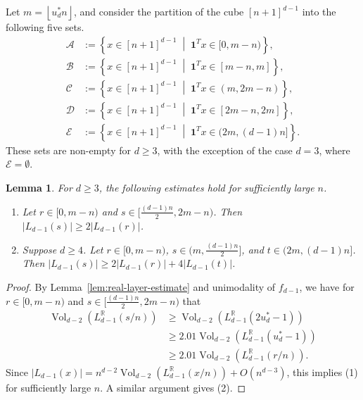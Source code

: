 \documentclass{article}
\newcommand{\floor}[1]{\left\lfloor #1 \right\rfloor}
\newcommand{\setcond}[2]{\left\{ #1 \;\middle\vert\; #2 \right\}}
\newcommand{\RR}{\mathbb{R}}
\newcommand{\cA}{\mathcal{A}}
\newcommand{\cB}{\mathcal{B}}
\newcommand{\cC}{\mathcal{C}}
\newcommand{\cD}{\mathcal{D}}
\newcommand{\cE}{\mathcal{E}}
\newcommand{\ones}{\mathbf{1}}
\newtheorem{lem}[thm]{Lemma}
\theoremstyle{definition}
\DeclareMathOperator{\Vol}{Vol}
\begin{document}
Let $m=\floor{u_d^* n}$, and consider the partition of the cube $[n+1]^{d-1}$ into the following five sets.
\begin{align*}
    \cA & := \setcond{x\in [n+1]^{d-1}}{\ones^T x \in [0,m-n)}, \\
    \cB & := \setcond{x\in [n+1]^{d-1}}{\ones^T x \in [m-n,m]}, \\
    \cC & := \setcond{x\in [n+1]^{d-1}}{\ones^T x \in (m,2m-n)}, \\
    \cD & := \setcond{x\in [n+1]^{d-1}}{\ones^T x \in [2m-n,2m]}, \\
    \cE & := \setcond{x\in [n+1]^{d-1}}{\ones^T x \in (2m,(d-1)n]}.
\end{align*}
These sets are non-empty for $d\geq 3$, with the exception of the case $d=3$, where $\cE=\emptyset$.

\begin{lem} \label{lem:layer-estimate}
    For $d\geq 3$, the following estimates hold for sufficiently large $n$.
    \begin{enumerate}
        \item Let $r\in [0,m-n)$ and $s\in [\frac{(d-1)n}{2},2m-n)$. Then $|L_{d-1}(s)|\geq 2|L_{d-1}(r)|$.
        \item Suppose $d\geq 4$. Let $r\in [0,m-n)$, $s\in (m,\frac{(d-1)n}{2}]$, and $t\in (2m,(d-1)n]$. Then $|L_{d-1}(s)|\geq 2|L_{d-1}(r)|+4|L_{d-1}(t)|$.
    \end{enumerate}
\end{lem}
\begin{proof}
    By Lemma~\ref{lem:real-layer-estimate} and unimodality of $f_{d-1}$, we have for $r\in [0,m-n)$ and $s\in [\frac{(d-1)n}{2},2m-n)$ that
    \begin{align*}
        \Vol_{d-2}(L_{d-1}^{\RR}(s/n)) &\geq \Vol_{d-2}(L_{d-1}^{\RR}(2u_d^*-1))\\
        &\geq 2.01\Vol_{d-2}(L_{d-1}^{\RR}(u_d^*-1))\\
        &\geq 2.01 \Vol_{d-2}(L_{d-1}^{\RR}(r/n)).
    \end{align*}
    Since $|L_{d-1}(x)|=n^{d-2}\Vol_{d-2}(L_{d-1}^{\RR}(x/n))+O(n^{d-3})$, this implies (1) for sufficiently large $n$. A similar argument gives (2).
\end{proof}
\end{document}
